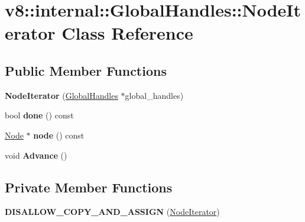 \hypertarget{classv8_1_1internal_1_1_global_handles_1_1_node_iterator}{}\section{v8\+:\+:internal\+:\+:Global\+Handles\+:\+:Node\+Iterator Class Reference}
\label{classv8_1_1internal_1_1_global_handles_1_1_node_iterator}
\subsection*{Public Member Functions}
\begin{DoxyCompactItemize}
\item 
{\bfseries Node\+Iterator} (\hyperlink{classv8_1_1internal_1_1_global_handles}{Global\+Handles} $\ast$global\+\_\+handles)\hypertarget{classv8_1_1internal_1_1_global_handles_1_1_node_iterator_aecbfa8d72760a3e1cd195b42dac1f26d}{}\label{classv8_1_1internal_1_1_global_handles_1_1_node_iterator_aecbfa8d72760a3e1cd195b42dac1f26d}

\item 
bool {\bfseries done} () const \hypertarget{classv8_1_1internal_1_1_global_handles_1_1_node_iterator_a40dc34978779f6791f0005cd70553fb5}{}\label{classv8_1_1internal_1_1_global_handles_1_1_node_iterator_a40dc34978779f6791f0005cd70553fb5}

\item 
\hyperlink{classv8_1_1internal_1_1_global_handles_1_1_node}{Node} $\ast$ {\bfseries node} () const \hypertarget{classv8_1_1internal_1_1_global_handles_1_1_node_iterator_aea2b9f927de249868e0ae8f9061f51df}{}\label{classv8_1_1internal_1_1_global_handles_1_1_node_iterator_aea2b9f927de249868e0ae8f9061f51df}

\item 
void {\bfseries Advance} ()\hypertarget{classv8_1_1internal_1_1_global_handles_1_1_node_iterator_a9b743acba4104988ae3f9a4db985133d}{}\label{classv8_1_1internal_1_1_global_handles_1_1_node_iterator_a9b743acba4104988ae3f9a4db985133d}

\end{DoxyCompactItemize}
\subsection*{Private Member Functions}
\begin{DoxyCompactItemize}
\item 
{\bfseries D\+I\+S\+A\+L\+L\+O\+W\+\_\+\+C\+O\+P\+Y\+\_\+\+A\+N\+D\+\_\+\+A\+S\+S\+I\+GN} (\hyperlink{classv8_1_1internal_1_1_global_handles_1_1_node_iterator}{Node\+Iterator})\hypertarget{classv8_1_1internal_1_1_global_handles_1_1_node_iterator_a703b65a9a47c20348f2eaa9486da179b}{}\label{classv8_1_1internal_1_1_global_handles_1_1_node_iterator_a703b65a9a47c20348f2eaa9486da179b}

\end{DoxyCompactItemize}
